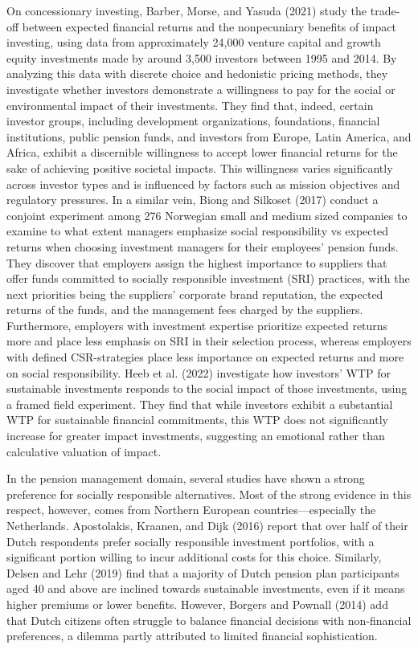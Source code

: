 \documentclass[
  12pt,
]{article}
\begin{document}
On concessionary investing, Barber, Morse, and Yasuda (2021) study the trade-off between expected financial returns and the nonpecuniary benefits of impact investing, using data from approximately 24,000 venture capital and growth equity investments made by around 3,500 investors between 1995 and 2014. By analyzing this data with discrete choice and hedonistic pricing methods, they investigate whether investors demonstrate a willingness to pay for the social or environmental impact of their investments. They find that, indeed, certain investor groups, including development organizations, foundations, financial institutions, public pension funds, and investors from Europe, Latin America, and Africa, exhibit a discernible willingness to accept lower financial returns for the sake of achieving positive societal impacts. This willingness varies significantly across investor types and is influenced by factors such as mission objectives and regulatory pressures. In a similar vein, Biong and Silkoset (2017) conduct a conjoint experiment among 276 Norwegian small and medium sized companies to examine to what extent managers emphasize social responsibility vs expected returns when choosing investment managers for their employees' pension funds. They discover that employers assign the highest importance to suppliers that offer funds committed to socially responsible investment (SRI) practices, with the next priorities being the suppliers' corporate brand reputation, the expected returns of the funds, and the management fees charged by the suppliers. Furthermore, employers with investment expertise prioritize expected returns more and place less emphasis on SRI in their selection process, whereas employers with defined CSR-strategies place less importance on expected returns and more on social responsibility. Heeb et al. (2022) investigate how investors' WTP for sustainable investments responds to the social impact of those investments, using a framed field experiment. They find that while investors exhibit a substantial WTP for sustainable financial commitments, this WTP does not significantly increase for greater impact investments, suggesting an emotional rather than calculative valuation of impact.

In the pension management domain, several studies have shown a strong preference for socially responsible alternatives. Most of the strong evidence in this respect, however, comes from Northern European countries---especially the Netherlands. Apostolakis, Kraanen, and Dijk (2016) report that over half of their Dutch respondents prefer socially responsible investment portfolios, with a significant portion willing to incur additional costs for this choice. Similarly, Delsen and Lehr (2019) find that a majority of Dutch pension plan participants aged 40 and above are inclined towards sustainable investments, even if it means higher premiums or lower benefits. However, Borgers and Pownall (2014) add that Dutch citizens often struggle to balance financial decisions with non-financial preferences, a dilemma partly attributed to limited financial sophistication.
\end{document}
